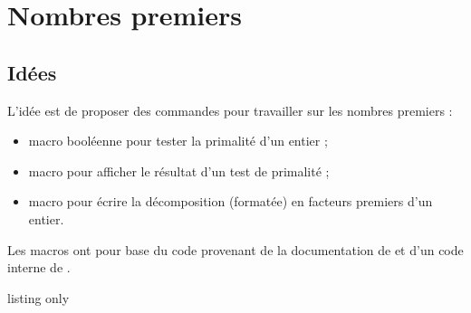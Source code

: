 \begin{PresCodePL}{}
\end{PresCodePL}

\begin{PresCodePL}{}
\end{PresCodePL}

\pagebreak

\begin{PresCodePL}{}
\end{PresCodePL}

\pagebreak

\begin{PresCodePL}{}
\end{PresCodePL}

\pagebreak

\begin{PresCodePL}{}
\end{PresCodePL}

\newpage

\section{Nombres premiers}\label{nbspremiers}

\subsection{Idées}

\begin{tipblock}
 L'idée est de proposer des commandes pour travailler sur les nombres premiers :

\begin{itemize}
	\item macro booléenne pour tester la primalité d'un entier ;
	\item macro pour afficher le résultat d'un test de primalité ;
	\item macro pour écrire la décomposition (formatée) en facteurs premiers d'un entier.
\end{itemize}

Les macros ont pour base du code provenant de la documentation de  et d'un code interne de .
\end{tipblock}

\begin{PresCodeTexPL}{listing only}
\end{PresCodeTexPL}

